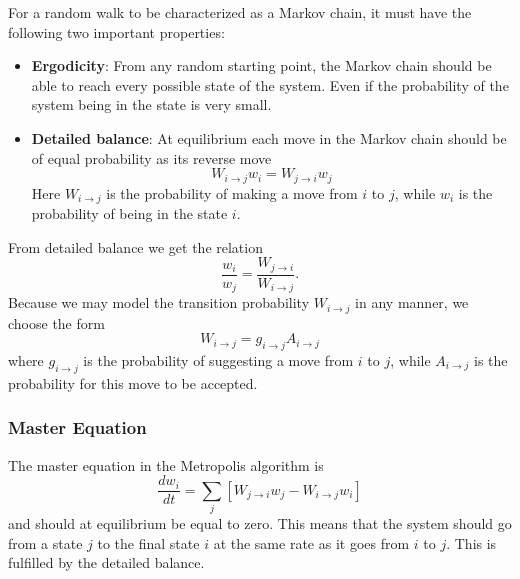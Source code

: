 \documentclass[aps,prb,twocolumn,floatfix]{revtex4}
\begin{document}
For a random walk to be characterized as a Markov chain, it must have the following two important properties:
\begin{itemize}
    \item \textbf{Ergodicity}: From any random starting point, the Markov chain should be able to reach every possible state of the system. Even if the probability of the system being in the state is very small.
    \item \textbf{Detailed balance}: At equilibrium each move in the Markov chain should be of equal probability as its reverse move
    \begin{equation}
        W_{i\to j} w_i = W_{j \to i} w_j
    \end{equation} 
    Here $W_{i\to j}$ is the probability of making a move from $i$ to $j$, while $w_i$ is the probability of being in the state $i$.
\end{itemize}
From detailed balance we get the relation
\begin{equation}
    \frac{w_i}{w_j} = \frac{W_{j\to i}}{W_{i\to j}}. %
\end{equation}
Because we may model the transition probability $W_{i \to j}$ in any manner, we choose the form
\begin{equation}
    W_{i \to j} = g_{i\to j} A_{i \to j}
\end{equation}
where $g_{i\to j}$ is the probability of suggesting a move from $i$ to $j$, while $A_{i \to j}$ is the probability for this move to be accepted.

\subsubsection{Master Equation} %
The master equation in the Metropolis algorithm is
\begin{equation}
    \frac{dw_i}{dt} = \sum_j \left [ W_{j \to i} w_j - W_{i \to j} w_i \right ]
\end{equation}
and should at equilibrium be equal to zero. This means that the system should go from a state $j$ to the final state $i$ at the same rate as it goes from $i$ to $j$. This is fulfilled by the detailed balance.
\end{document}

